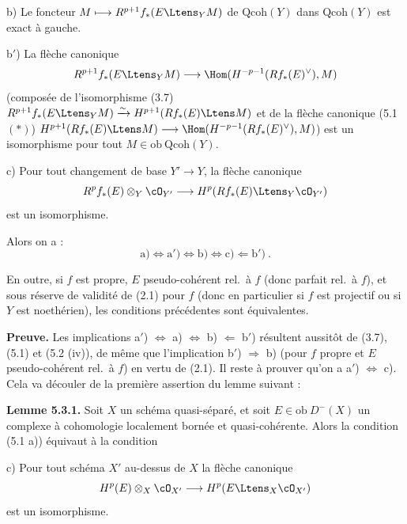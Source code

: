 \smallskip

\noindent b) Le foncteur $M \longmapsto R^{p+1}f_*(E \Ltens_Y M)$ de $\mathrm{Qcoh}(Y)$ dans $\mathrm{Qcoh}(Y)$ est exact \`{a} gauche.

\smallskip

\noindent b$'$) La fl\`{e}che canonique
\[
R^{p+1}f_*(E \Ltens_Y M) \longrightarrow \Hom(H^{-p-1}(Rf_*(E)^\vee), M)
\]
(compos\'{e}e de l'isomorphisme (3.7) $R^{p+1}f_*(E \Ltens_Y M) \xrightarrow{\sim} H^{p+1}(Rf_*(E) \Ltens M)$ et de la fl\`{e}che canonique (5.1 $(*)$) $H^{p+1}(Rf_*(E) \Ltens M) \longrightarrow \Hom(H^{-p-1}(Rf_*(E)^\vee), M)$) est un isomorphisme pour tout $M \in \mathrm{ob}\ \mathrm{Qcoh}(Y)$.

\smallskip

\noindent c) Pour tout changement de base $Y' \longrightarrow Y$, la fl\`{e}che canonique
\[
R^pf_*(E) \otimes_Y \cO_{Y'} \longrightarrow H^p(Rf_*(E) \Ltens_Y \cO_{Y'})
\]
est un isomorphisme.

\medskip

Alors on a :
\[
\mathrm{a)} \Longleftrightarrow \mathrm{a')} \Longleftrightarrow \mathrm{b)} \Longleftrightarrow \mathrm{c)} \Longleftarrow \mathrm{b')}\ .
\]

En outre, si $f$ est propre, $E$ pseudo-coh\'{e}rent rel.\ \`{a} $f$ (donc parfait rel.\ \`{a} $f$), et sous r\'{e}serve de validit\'{e} de (2.1) pour $f$ (donc en particulier si $f$ est projectif ou si $Y$ est noeth\'{e}rien), les conditions pr\'{e}c\'{e}dentes sont \'{e}quivalentes.

\medskip

\noindent\textbf{Preuve.} Les implications a$'$) $\Longleftrightarrow$ a) $\Longleftrightarrow$ b) $\Longleftarrow$ b$'$) r\'{e}sultent aussit\^{o}t de (3.7), (5.1) et (5.2 (iv)), de m\^{e}me que l'implication b$'$) $\Longrightarrow$ b) (pour $f$ propre et $E$ pseudo-coh\'{e}rent rel.\ \`{a} $f$) en vertu de (2.1). Il reste \`{a} prouver qu'on a a$'$) $\Longleftrightarrow$ c). Cela va d\'{e}couler de la premi\`{e}re assertion du lemme suivant :

\medskip

\noindent\textbf{Lemme 5.3.1.} Soit $X$ un sch\'{e}ma quasi-s\'{e}par\'{e}, et soit $E \in \mathrm{ob}\ D^-(X)$ un complexe \`{a} cohomologie localement born\'{e}e et quasi-coh\'{e}rente. Alors la condition (5.1 a)) \'{e}quivaut \`{a} la condition

\smallskip

\noindent c) Pour tout sch\'{e}ma $X'$ au-dessus de $X$ la fl\`{e}che canonique
\[
H^p(E) \otimes_X \cO_{X'} \longrightarrow H^p(E \Ltens_X \cO_{X'})
\]
est un isomorphisme.

